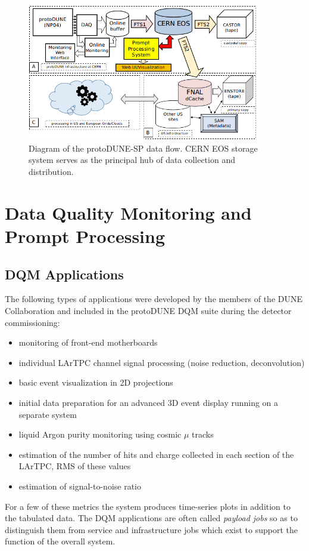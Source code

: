 \documentclass{webofc}
\newcommand{\pd}{protoDUNE\xspace}
\begin{document}
\begin{figure}[tb]
\centering\includegraphics[width=0.9\textwidth]{figures/protoDUNE_data_flow_2018_v1.png}
\caption{\label{fig:dataflow}Diagram of the protoDUNE-SP data flow. CERN EOS storage system serves as the principal hub of data collection and distribution.}
\end{figure}


\section{Data Quality Monitoring and Prompt Processing}
\subsection{DQM Applications}
The following types of applications were developed by the members of the DUNE Collaboration and
included in the \pd DQM suite during the detector
commissioning:
\begin{itemize}
\item monitoring of front-end motherboards
\item individual LArTPC channel signal processing (noise reduction, deconvolution)
\item basic event visualization in 2D projections
\item initial data preparation for an advanced 3D event display running on a separate system
\item liquid Argon purity monitoring using cosmic $\mu$ tracks
\item estimation of the number of hits and charge collected in each section of the LArTPC, RMS of these values
\item estimation of signal-to-noise ratio
\end{itemize}

\noindent For a few of these metrics the system produces time-series plots in addition to the tabulated data.
The DQM applications are often called \textit{payload jobs} so as to distinguish them from service and
infrastructure jobs which exist to support the function of the overall system.
\end{document}
